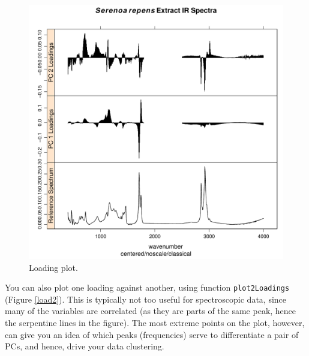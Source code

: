 \documentclass[letter,10pt,twocolumn,twoside,printwatermark=false]{pinp}
\begin{document}
\begin{Shaded}
\begin{Highlighting}[]
   \NormalTok{(}\NormalTok{, }\NormalTok{),}
   \NormalTok{)}
\end{Highlighting}
\end{Shaded}

\begin{figure}

{\centering \includegraphics[width=\linewidth,height=\linewidth]{ChemoSpec2_files/figure-latex/Chunk29-1} 

}

\caption{\label{load}Loading plot.}\label{fig:Chunk29}
\end{figure}

You can also plot one loading against another, using function
\texttt{plot2Loadings} (Figure \ref{load2}). This is typically not too
useful for spectroscopic data, since many of the variables are
correlated (as they are parts of the same peak, hence the serpentine
lines in the figure). The most extreme points on the plot, however, can
give you an idea of which peaks (frequencies) serve to differentiate a
pair of PCs, and hence, drive your data clustering.
\end{document}

